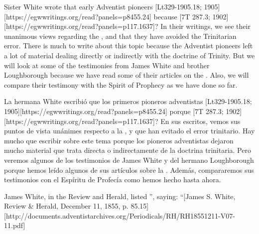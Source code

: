 



Sister White wrote that early Adventist pioneers [Lt329-1905.18; 1905][https://egwwritings.org/read?panels=p8455.24] because [7T 287.3; 1902][https://egwwritings.org/read?panels=p117.1637]? In their writings, we see their unanimous views regarding the , and that they have avoided the Trinitarian error. There is much to write about this topic because the Adventist pioneers left a lot of material dealing directly or indirectly with the doctrine of Trinity. But we will look at some of the testimonies from James White and brother Loughborough because we have read some of their articles on the . Also, we will compare their testimony with the Spirit of Prophecy as we have done so far.


La hermana White escribió que los primeros pioneros adventistas [Lt329-1905.18; 1905][https://egwwritings.org/read?panels=p8455.24] porque [7T 287.3; 1902][https://egwwritings.org/read?panels=p117.1637]? En sus escritos, vemos sus puntos de vista unánimes respecto a la , y que han evitado el error trinitario. Hay mucho que escribir sobre este tema porque los pioneros adventistas dejaron mucho material que trata directa o indirectamente de la doctrina trinitaria. Pero veremos algunos de los testimonios de James White y del hermano Loughborough porque hemos leído algunos de sus artículos sobre la . Además, compararemos sus testimonios con el Espíritu de Profecía como hemos hecho hasta ahora.


James White, in the Review and Herald, listed ”, saying: “[James S. White, Review \& Herald, December 11, 1855, p. 85.15][http://documents.adventistarchives.org/Periodicals/RH/RH18551211-V07-11.pdf]


